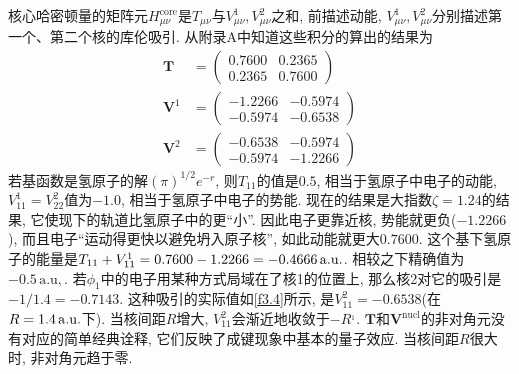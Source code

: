 
核心哈密顿量的矩阵元$H_{\mu\nu}^\mathrm{core}$是$T_{\mu\nu}$与$V_{\mu\nu}^1,V_{\mu\nu}^2$之和, 
前描述动能, 
$V_{\mu\nu}^1,V_{\mu\nu}^2$分别描述第一个、第二个核的库伦吸引. 
从附录A中知道这些积分的算出的结果为
\begin{align}
	\mathbf{T} & = 
	\begin{pmatrix}
		0.7600&0.2365\\0.2365&0.7600
	\end{pmatrix}\\
	\mathbf{V}^1 & = 
	\begin{pmatrix}
		-1.2266&-0.5974\\-0.5974&-0.6538
	\end{pmatrix}\\
	\mathbf{V}^2 & = 
	\begin{pmatrix}
		-0.6538&-0.5974\\-0.5974&-1.2266
	\end{pmatrix}
\end{align}
若基函数是氢原子的解$(\pi)^{1/2}e^{-r}$, 
则$T_{11}$的值是$0.5$, 
相当于氢原子中电子的动能, 
$V_{11}^1=V_{22}^2$值为$-1.0$, 
相当于氢原子中电子的势能. 
现在的结果是大指数$\zeta=1.24$的结果, 
它使现下的轨道比氢原子中的更``小”. 
因此电子更靠近核, 
势能就更负($-1.2266$), 
而且电子``运动得更快以避免坍入原子核”, 
如此动能就更大$0.7600$. 
这个基下氢原子的能量是$T_{11}+V_{11}^1=0.7600-1.2266=-0.4666\,\mathrm{a.u.}$. 
相较之下精确值为$-0.5\,\mathrm{a.u,}$. 
若$\phi_1$中的电子用某种方式局域在了核1的位置上, 
那么核2对它的吸引是$-1/1.4=-0.7143$. 
这种吸引的实际值如\autoref{f3.4}所示, 
是$V_{11}^2=-0.6538$(在$R=1.4\,\mathrm{a.u.}$下). 
当核间距$R$增大, 
$V_{11}^2$会渐近地收敛于$-R^{_1}$. 
$\mathbf{T}$和$\mathbf{V}^\mathrm{nucl}$的非对角元没有对应的简单经典诠释, 
它们反映了成键现象中基本的量子效应. 
当核间距$R$很大时, 
非对角元趋于零.


